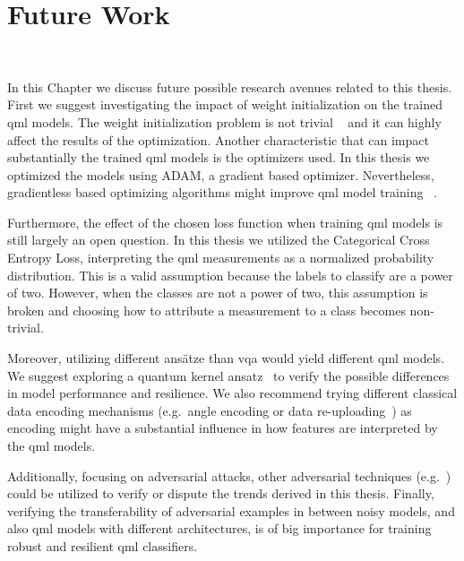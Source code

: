 \chapter{Future Work}\label{chapter:future_work} \

In this Chapter we discuss future possible research avenues related to
this thesis. First we suggest investigating the impact of weight initialization
on the trained \ac{qml} models. The weight initialization problem is not trivial
~\cite{mcclean_barren_2018} and it can highly affect the results of the
optimization. Another characteristic that can impact substantially the
trained \ac{qml} models is the optimizers used. In this thesis we optimized
the models using ADAM, a gradient based optimizer. Nevertheless, gradientless
based optimizing algorithms might improve \ac{qml} model training
~\cite{kulshrestha_learning_2023}. \ 

Furthermore, the effect of the chosen loss function when training \ac{qml}
models is still largely an open question. In this thesis we utilized
the Categorical Cross Entropy Loss, interpreting the \ac{qml} measurements
as a normalized probability distribution. This is a valid assumption
because the labels to classify are a power of two. However, when the classes
are not a power of two, this assumption is broken and choosing how to
attribute a measurement to a class becomes non-trivial. \

Moreover, utilizing different ansätze than \ac{vqa} would yield
different \ac{qml} models. We suggest exploring
a quantum kernel ansatz~\cite{hubregtsen_training_2022} to
verify the possible differences in model performance and resilience.
We also recommend trying different classical data encoding mechanisms
(e.g.\ angle encoding or data re-uploading~\cite{aminpour_strategic_2024})
as encoding might have a substantial influence in how features
are interpreted by the \ac{qml} models. \

Additionally, focusing on adversarial attacks, other adversarial
techniques (e.g.~\cite{carlini_towards_2017}) could be utilized
to verify or dispute the trends derived in this thesis. Finally,
verifying the transferability of adversarial examples in between noisy
models, and also \ac{qml} models with different architectures, is of big importance
for training robust and resilient \ac{qml} classifiers. \
